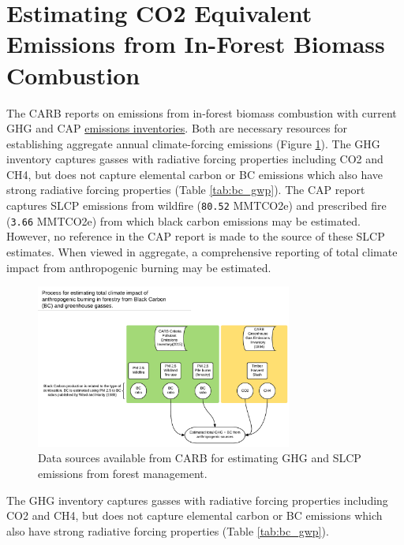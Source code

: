 \documentclass[a4paper]{article}
\begin{document}
\section{Estimating CO2 Equivalent Emissions from In-Forest Biomass Combustion}
\label{sec:orgheadline9}


The \ac{CARB} reports on emissions from in-forest biomass combustion with current \ac{GHG} and \ac{CAP} \href{http://www.arb.ca.gov/ei/ei.htm}{emissions inventories}. Both are necessary resources for establishing aggregate annual climate-forcing emissions (Figure \ref{fig:burn_diag}). 
The GHG inventory captures
gasses with radiative forcing properties including CO2 and CH4, but does not capture elemental
carbon or \ac{BC} emissions which also have strong radiative
forcing properties (Table \ref{tab:bc_gwp}). The \citet{CaliforniaAirResourcesBoard2015,CaliforniaAirResourcesBoard2016}
\ac{CAP} report captures \ac{SLCP} emissions from wildfire
(\texttt{80.52} MMTCO2e) and prescribed fire
(\texttt{3.66} MMTCO2e) from which black carbon emissions may be estimated. However, no reference in the CAP report is made to the source of these
SLCP estimates. When viewed in aggregate, a comprehensive reporting of total climate impact from anthropogenic burning may be estimated. 


\begin{figure}[htb]
\centering
\includegraphics[width=0.75\textwidth]{./graphics/burning.pdf}
\caption{Data sources available from CARB for estimating \ac{GHG} and \ac{SLCP} emissions from forest management. \label{fig:burn_diag}}
\end{figure}

The \ac{GHG} inventory captures
gasses with radiative forcing properties including CO2 and CH4, but does not capture elemental
carbon or \ac{BC} emissions which also have strong radiative
forcing properties (Table \ref{tab:bc_gwp}). 
\end{document}
